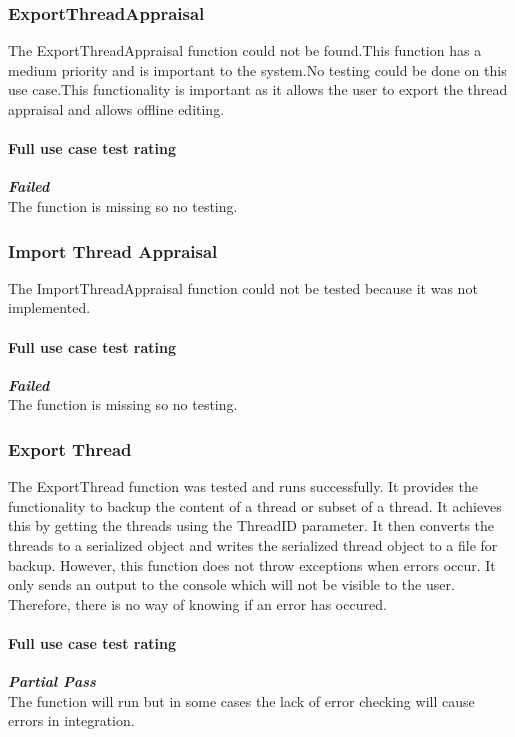 \subsubsection{ExportThreadAppraisal}
The ExportThreadAppraisal function could not be found.This function has a medium priority and is important to the system.No testing could be done on this use case.This functionality is important as it allows the user to  export the thread appraisal and allows offline editing.
\paragraph{\color{black} Full use case test rating\\}
\color{red}
\textbf{\small \emph{Failed}} \\
\color{black} The function is missing so no testing.

\subsubsection{Import Thread Appraisal}
The ImportThreadAppraisal function could not be tested because it was not implemented. 
\paragraph{\color{black} Full use case test rating\\}
\color{red}
\textbf{\small \emph{Failed}} \\
\color{black} The function is missing so no testing.

\subsubsection{Export Thread}
The ExportThread function was tested and runs successfully. It provides the functionality to backup the content of a thread or subset of a thread. It achieves this by getting the threads using the ThreadID parameter. It then converts the threads to a serialized object and writes the serialized thread object to a file for backup. However, this function does not throw exceptions when errors occur. It only sends an output to the console which will not be visible to the user. Therefore, there is no way of knowing if an error has occured.
\paragraph{\color{black} Full use case test rating\\}
\color{myOrange}
\textbf{\small \emph{Partial Pass}} \\
\color{black} The function will run but in some cases the lack of error checking will cause errors in integration.
